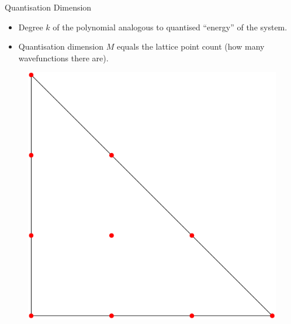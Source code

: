 \begin{frame}{Quantisation Dimension}

    \begin{itemize}
    \item Degree $k$ of the polynomial analogous to quantised ``energy'' of the system.
    \item Quantisation dimension $M$ equals the lattice point count (how many wavefunctions there are).
    \end{itemize}

    \begin{figure}
        \includegraphics[scale=0.25]{resources/polynomials.png}
    \end{figure}

\end{frame}

